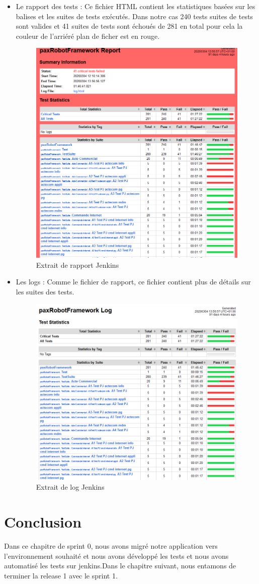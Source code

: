 \begin{itemize}
	\item Le rapport des tests : Ce fichier HTML contient les statistiques basées sur les balises et les suites de tests exécutés. Dans notre cas 240 tests suites de tests sont valides  et 41 suites de tests sont échoués de 281 en total pour cela la couleur de l'arriéré plan de ficher est en rouge.
\begin{figure}[H]
		\centering
		\includegraphics[width=0.575\linewidth]{"img/jenkins/exemple report"}
		\caption[Extrait de rapport Jenkins]{Extrait de rapport Jenkins}
		\label{fig:exemple-report}
	\end{figure}
	\item Les logs : Comme le fichier de rapport, ce fichier contient plus de détails sur les suites des tests.
	\begin{figure}[H]
		\centering
		\includegraphics[width=0.575\linewidth]{"img/jenkins/exemple log"}
		\caption[Extrait de log Jenkins]{Extrait de log Jenkins}
		\label{fig:exemple-log}
	\end{figure}
\end{itemize}

\section*{Conclusion}
Dans ce chapitre de sprint 0, nous avons migré notre application vers l’environnement souhaité et nous avons développé les tests et nous avons automatisé les tests sur jenkins.Dans le chapitre suivant, nous entamons de terminer la release 1 avec le sprint 1.



